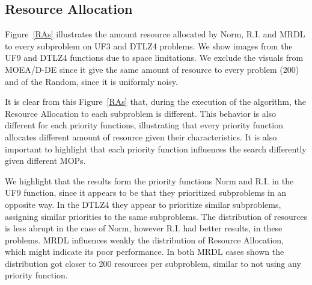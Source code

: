\subsection{Resource Allocation}



Figure~\ref{RAs} illustrates the amount resource allocated by Norm, R.I. and MRDL to every subproblem on UF3 and DTLZ4 problems. We show images from the UF9 and DTLZ4 functions due to space limitations. We exclude the visuals from MOEA/D-DE since it give the same amount of resource to every problem (200) and of the Random, since it is uniformly noisy.

It is clear from this Figure~\ref{RAs} that, during the execution of the algorithm, the Resource Allocation to each subproblem is different. This behavior is also different for each priority functions, illustrating that every priority function allocates different amount of resource given their characteristics. It is also important to highlight that each priority function influences the search differently given different MOPs.

We highlight that the results form the priority functions Norm and R.I. in the UF9 function, since it appears to be that they prioritized subproblems in an opposite way. In the DTLZ4 they appear to prioritize similar subproblems, assigning similar priorities to the same subproblems. The distribution of resources is less abrupt in the case of Norm, however R.I. had better results, in these problems. MRDL influences weakly the distribution of Resource Allocation, which might indicate its poor performance. In both MRDL cases shown the distribution got closer to 200 resources per subproblem, similar to not using any priority function.





